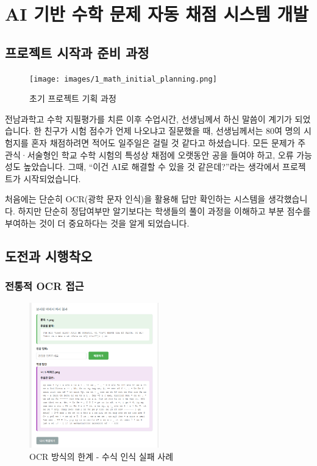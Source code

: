 \section{AI 기반 수학 문제 자동 채점 시스템 개발}

\subsection{프로젝트 시작과 준비 과정}

\begin{figure}[H]
    \centering
    \texttt{[image: images/1\_math\_initial\_planning.png]}
    \caption{초기 프로젝트 기획 과정}
    \label{fig:math_initial_planning}
\end{figure}

전남과학고 수학 지필평가를 치른 이후 수업시간, 선생님께서 하신 말씀이 계기가 되었습니다. 한 친구가 시험 점수가 언제 나오냐고 질문했을 때, 선생님께서는 80여 명의 시험지를 혼자 채점하려면 적어도 일주일은 걸릴 것 같다고 하셨습니다. 모든 문제가 주관식·서술형인 학교 수학 시험의 특성상 채점에 오랫동안 공을 들여야 하고, 오류 가능성도 높았습니다. 그때, ``이건 AI로 해결할 수 있을 것 같은데?''라는 생각에서 프로젝트가 시작되었습니다.

처음에는 단순히 OCR(광학 문자 인식)을 활용해 답만 확인하는 시스템을 생각했습니다. 하지만 단순히 정답여부만 알기보다는 학생들의 풀이 과정을 이해하고 부분 점수를 부여하는 것이 더 중요하다는 것을 알게 되었습니다.

\subsection{도전과 시행착오}

\subsubsection{전통적 OCR 접근}

\begin{figure}[H]
    \centering
    \includegraphics[width=0.5\textwidth]{1/image02.png}
    \caption{OCR 방식의 한계 - 수식 인식 실패 사례}
    \label{fig:math_ocr_failure}
\end{figure}

